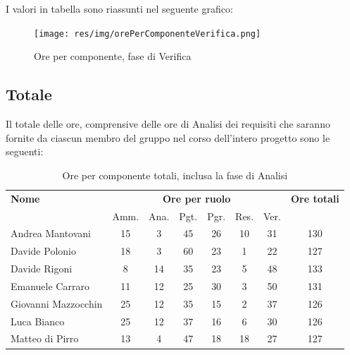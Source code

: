 I valori in tabella sono riassunti nel seguente grafico: \\ 

    \begin{figure}[H]
      \begin{center}
        \texttt{[image: res/img/orePerComponenteVerifica.png]}
      \caption{Ore per componente, fase di Verifica}
      \end{center} 
    \end{figure}    
   
    
    
\pagebreak
\subsection{Totale}
Il totale delle ore, comprensive delle ore di Analisi dei requisiti che saranno fornite da ciascun membro
del gruppo nel corso dell’intero progetto sono le seguenti:

\begin{table}[H]
\begin{tabular}{lccccccc}
\toprule
    \textbf{Nome}  & \multicolumn{6}{c}{\textbf{Ore per ruolo}} & \textbf{Ore totali} \\
     & Amm. & Ana. & Pgt. & Pgr. & Res. & Ver. & \\
    \midrule
   
	   Andrea Mantovani & 15 & 3 & 45 & 26 & 10 & 31 & 130 \\
	     Davide Polonio & 18 & 3 & 60 & 23 & 1 & 22 & 127 \\
	      Davide Rigoni & 8 & 14 & 35 & 23 & 5 & 48 & 133 \\
	   Emanuele Carraro & 11 & 12 & 25 & 30 & 3 & 50 & 131 \\
	Giovanni Mazzocchin & 25 & 12 & 35 & 15 & 2 & 37 & 126 \\ 
	        Luca Bianco & 25 & 12 & 37 & 16 & 6 & 30 & 126 \\ 
	    Matteo di Pirro & 13 & 4 & 47 & 18 & 18 & 27 & 127 \\ 
   
    \bottomrule
\end{tabular}
\caption{Ore per componente totali, inclusa la fase di Analisi}
\end{table}

